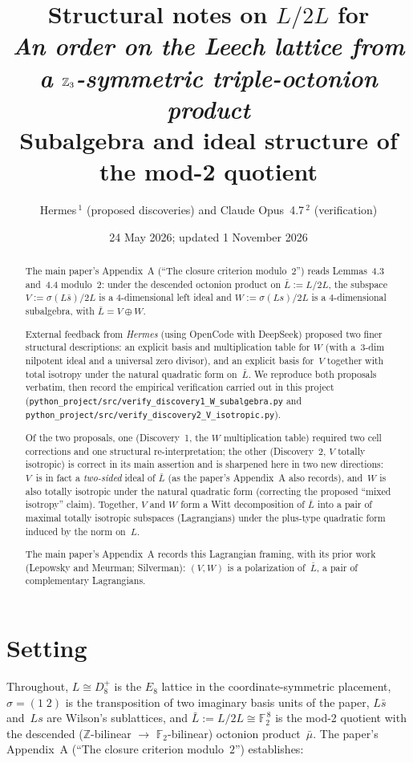 \documentclass[11pt]{amsart}
\title[Mod-2 structure of $L/2L$: external proposal, verification, corrections]%
{Structural notes on $L/2L$ for\\
\emph{An order on the Leech lattice from a $\ZZ_3$-symmetric
triple-octonion product}\\
\large Subalgebra and ideal structure of the mod-2 quotient}
\author{Hermes\,$^{1}$ (proposed discoveries) and Claude Opus~4.7\,$^{2}$ (verification)}
\date{24 May 2026; updated 1 November 2026}
\newcommand{\ZZ}{\mathbb{Z}}
\newcommand{\FF}{\mathbb{F}}
\begin{document}
\maketitle

\begin{abstract}
The main paper's Appendix~A (``The closure criterion modulo~$2$'') reads
Lemmas~4.3 and~4.4 modulo~$2$: under the descended octonion product on
$\bar L := L/2L$, the subspace $V := \sigma(L\bar s)/2L$ is a
$4$-dimensional left ideal and $W := \sigma(Ls)/2L$ is a $4$-dimensional
subalgebra, with $\bar L = V \oplus W$.

External feedback from \emph{Hermes} (using OpenCode with DeepSeek) proposed two
finer structural descriptions: an explicit basis and multiplication
table for $W$ (with a~3-dim nilpotent ideal and a universal zero
divisor), and an explicit basis for~$V$ together with total isotropy
under the natural quadratic form on~$\bar L$. We reproduce both
proposals verbatim, then record the empirical verification carried out
in this project
(\texttt{python\_project/src/verify\_discovery1\_W\_subalgebra.py} and
\texttt{python\_project/src/verify\_discovery2\_V\_isotropic.py}).

Of the two proposals, one (Discovery~1, the $W$ multiplication table)
required two cell corrections and one structural re-interpretation;
the other (Discovery~2, $V$ totally isotropic) is correct in its
main assertion and is sharpened here in two new directions: $V$~is
in fact a \emph{two-sided} ideal of $\bar L$ (as the paper's Appendix~A
also records), and~$W$ is also totally isotropic under the natural
quadratic form (correcting the proposed ``mixed isotropy''
claim). Together, $V$ and $W$ form a Witt decomposition of $\bar L$
into a pair of maximal totally isotropic subspaces (Lagrangians) under
the plus-type quadratic form induced by the norm on~$L$.

The main paper's Appendix~A records this Lagrangian framing, with its
prior work (Lepowsky and Meurman; Silverman): $(V, W)$ is a polarization of~$\bar L$, a pair of complementary
Lagrangians.
\end{abstract}

\section{Setting}

Throughout, $L \cong D_8^+$ is the $E_8$ lattice in the
coordinate-symmetric placement, $\sigma = (1\;2)$ is the transposition
of two imaginary basis units of the paper, $L\bar s$ and~$Ls$ are
Wilson's sublattices, and $\bar L := L/2L \cong \FF_2^{\,8}$
is the mod-2 quotient with the descended ($\ZZ$-bilinear $\to$ $\FF_2$-bilinear)
octonion product~$\bar\mu$. The paper's Appendix~A (``The closure
criterion modulo~$2$'') establishes:
\end{document}

